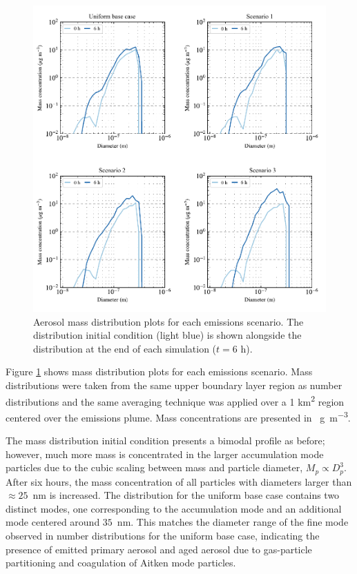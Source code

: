 \begin{figure}[!t]
  \centering
    \includegraphics[width=\textwidth]{figures/chapter5/mass-distribution-plots.pdf}
    \caption{Aerosol mass distribution plots for each emissions scenario. The distribution initial condition (light blue) is shown alongside the distribution at the end of each simulation ($t=6$ h).}
    \label{fig:mass-dists}
\end{figure}

Figure \ref{fig:mass-dists} shows mass distribution plots for each emissions scenario. Mass distributions were taken from the same upper boundary layer region as number distributions and the same averaging technique was applied over a 1 \si{km^2} region centered over the emissions plume. Mass concentrations are presented in \si{\mu g.m^{-3}}. 

The mass distribution initial condition presents a bimodal profile as before; however, much more mass is concentrated in the larger accumulation mode particles due to the cubic scaling between mass and particle diameter, $M_p \propto D_p^3$. After six hours, the mass concentration of all particles with diameters larger than $\approx25$~nm is increased. The distribution for the uniform base case contains two distinct modes, one corresponding to the accumulation mode and an additional mode centered around $35$~nm. This matches the diameter range of the fine mode observed in number distributions for the uniform base case, indicating the presence of emitted primary aerosol and aged aerosol due to gas-particle partitioning and coagulation of Aitken mode particles. 

